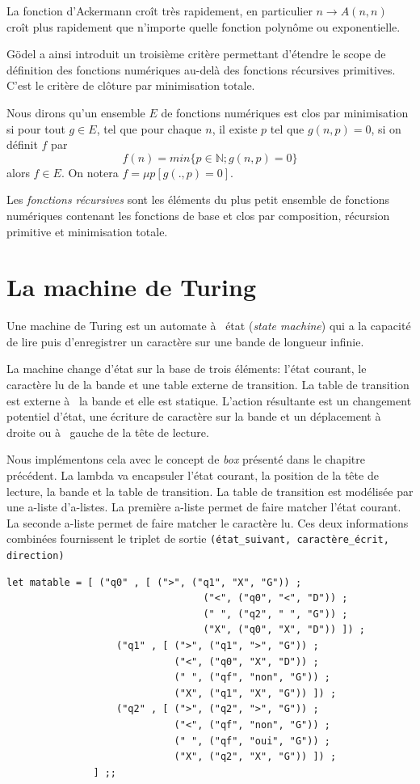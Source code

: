 \documentclass[11pt]{book}
\begin{document}
La fonction d’Ackermann croît très rapidement, en particulier $n \rightarrow A(n, n)$ croît
plus rapidement que n’importe quelle fonction polynôme ou exponentielle.


Gödel a ainsi introduit un troisième critère permettant d'étendre le scope de définition des
fonctions numériques au-delà des fonctions récursives primitives. C'est le critère
de clôture par minimisation totale.

Nous dirons qu'un ensemble $E$ de fonctions numériques est clos par minimisation si
pour tout $g \in E$, tel que pour chaque $n$, il existe $p$ tel que $g(n,p)=0$, si on définit
$f$ par
$$ f(n) = min\{p\in \mathbb{N} ; g(n,p) = 0   \} $$
alors $f\in E$. On notera $f =\mu p [g(.,p)=0]$.

Les  \textit{fonctions récursives} sont les éléments du plus petit ensemble de fonctions
numériques contenant les fonctions de base et clos par composition, récursion primitive et 
minimisation totale.

\section{La machine de Turing}
Une machine de Turing est un automate à  état (\textit{state machine}) qui a la
capacité de lire puis  d'enregistrer un caractère sur une bande de longueur
infinie. 

La machine change d'état sur la base de trois éléments: l'état courant,
le caractère lu de la bande et une table externe de transition. La table de
transition est externe à  la bande et elle est statique.
 L'action résultante est un changement potentiel d'état, une écriture de
 caractère sur la bande et un déplacement à  droite ou à  gauche de la tête de
 lecture.

Nous implémentons cela avec le concept de \textit{box} présenté dans le chapitre
précédent. La lambda va encapsuler l'état courant, la position de la tête de
lecture, la bande et la table de transition.
La table de transition est modélisée par une a-liste d'a-listes.
La première a-liste permet de faire matcher l'état courant.
La seconde a-liste permet de faire matcher le caractère lu.
Ces deux informations combinées fournissent  le triplet de sortie
\verb+(état_suivant, caractère_écrit, direction)+

\begin{Verbatim}
let matable = [ ("q0" , [ (">", ("q1", "X", "G")) ;
								  ("<", ("q0", "<", "D")) ; 
								  (" ", ("q2", " ", "G")) ;
								  ("X", ("q0", "X",	"D")) ]) ;
			       ("q1" , [ (">", ("q1", ">", "G")) ;
			                 ("<", ("q0", "X", "D")) ;
			                 (" ", ("qf", "non", "G")) ;
			                 ("X", ("q1", "X", "G")) ]) ;
			       ("q2" , [ (">", ("q2", ">", "G")) ;
			                 ("<", ("qf", "non", "G")) ;
			                 (" ", ("qf", "oui", "G")) ;
			                 ("X", ("q2", "X", "G")) ]) ;
			   ] ;;
\end{Verbatim}
\end{document}
